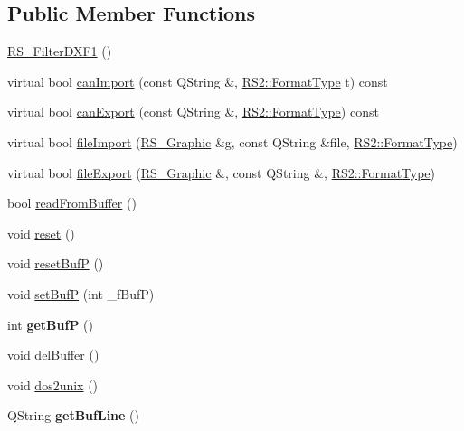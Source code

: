 \subsection*{Public Member Functions}
\begin{DoxyCompactItemize}
\item 
\hyperlink{classRS__FilterDXF1_a1c835b5ac49fabc402b81d8b7aef3dc1}{R\-S\-\_\-\-Filter\-D\-X\-F1} ()
\item 
virtual bool \hyperlink{classRS__FilterDXF1_ab201625ba2d95c01efe9cee244f4f187}{can\-Import} (const Q\-String \&, \hyperlink{classRS2_a077a6c94c9a0ab9962c4d4a612c7189b}{R\-S2\-::\-Format\-Type} t) const 
\item 
virtual bool \hyperlink{classRS__FilterDXF1_a556f382e48302117268f1080de34792d}{can\-Export} (const Q\-String \&, \hyperlink{classRS2_a077a6c94c9a0ab9962c4d4a612c7189b}{R\-S2\-::\-Format\-Type}) const 
\item 
virtual bool \hyperlink{classRS__FilterDXF1_a6beab6ec3b112a9c956150b0dd9db1df}{file\-Import} (\hyperlink{classRS__Graphic}{R\-S\-\_\-\-Graphic} \&g, const Q\-String \&file, \hyperlink{classRS2_a077a6c94c9a0ab9962c4d4a612c7189b}{R\-S2\-::\-Format\-Type})
\item 
virtual bool \hyperlink{classRS__FilterDXF1_acbeb13283cf577c9d69ee1fafb3d323a}{file\-Export} (\hyperlink{classRS__Graphic}{R\-S\-\_\-\-Graphic} \&, const Q\-String \&, \hyperlink{classRS2_a077a6c94c9a0ab9962c4d4a612c7189b}{R\-S2\-::\-Format\-Type})
\item 
bool \hyperlink{classRS__FilterDXF1_ab5fe0390d2e2eb88f08217a38673ec6b}{read\-From\-Buffer} ()
\item 
void \hyperlink{classRS__FilterDXF1_addb90f0893dafaacb236cdba08190ef1}{reset} ()
\item 
void \hyperlink{classRS__FilterDXF1_a04201004d2255555b255544d4c5745dc}{reset\-Buf\-P} ()
\item 
void \hyperlink{classRS__FilterDXF1_af3cd551b57d520a36892efff63c1611d}{set\-Buf\-P} (int \-\_\-f\-Buf\-P)
\item 
\hypertarget{classRS__FilterDXF1_abb3554e1b4fd00bb467532f455d155b3}{int {\bfseries get\-Buf\-P} ()}\label{classRS__FilterDXF1_abb3554e1b4fd00bb467532f455d155b3}

\item 
void \hyperlink{classRS__FilterDXF1_a6d6f84a7b91978fa669d9c5245fe47e5}{del\-Buffer} ()
\item 
void \hyperlink{classRS__FilterDXF1_a33db3f7fda72b9b3609fd3c3f7a71a1b}{dos2unix} ()
\item 
\hypertarget{classRS__FilterDXF1_a786c1dbcbd3beb7ea86a1da4840ced01}{Q\-String {\bfseries get\-Buf\-Line} ()}\label{classRS__FilterDXF1_a786c1dbcbd3beb7ea86a1da4840ced01}


\end{DoxyCompactItemize}
